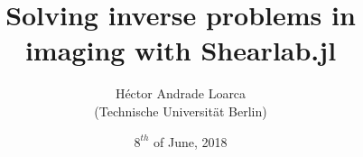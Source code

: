 \title[SIAM IS 2018]{Solving inverse problems in imaging with Shearlab.jl}
\author[H\'ector Andrade Loarca (TU Berlin)]{H\'ector Andrade Loarca \\ (Technische Universit\"at Berlin)} 
\date[08.06.2018]{$8^{th}$ of June, 2018}


\newcommand{\mylogo}{\texttt{[image: ./Images/AFG.pdf]}}

\begin{frame}[plain]
        \titlepage
\end{frame}

